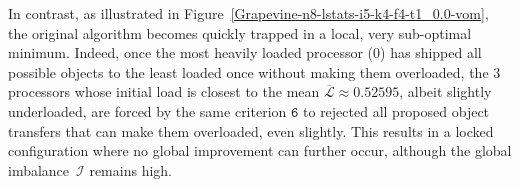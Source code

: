 In contrast, as illustrated in
Figure~\ref{Grapevine-n8-lstats-i5-k4-f4-t1_0.0-vom}, the original
algorithm becomes quickly trapped in a local, very sub-optimal minimum.
Indeed, once the most heavily loaded processor ($0$) has shipped all
possible objects to the least loaded once without making them
overloaded, the $3$ processors whose initial load is closest to the
mean $\overline{\mathcal{L}}\approx0.52595$, albeit slightly
underloaded, are forced by the same criterion $\texttt{6}$
to rejected all proposed object transfers that can make them
overloaded, even slightly.
This results in a locked configuration where no global improvement can
further occur, although the global imbalance~$\mathcal{I}$ remains
high.